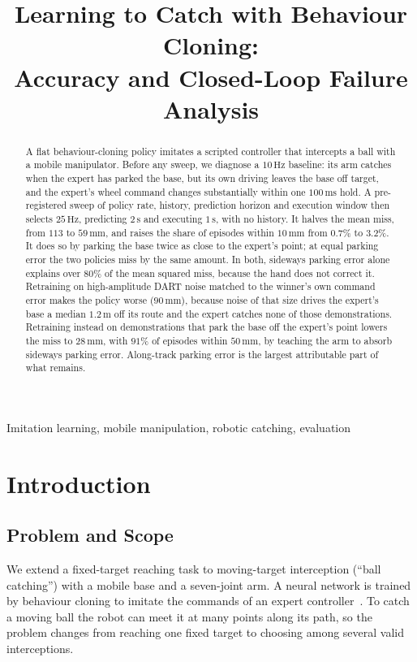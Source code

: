 \documentclass[conference]{IEEEtran}
\title{Learning to Catch with Behaviour Cloning:\\
Accuracy and Closed-Loop Failure Analysis}
\author{\IEEEauthorblockN{William Boyd, Nick Wright, Yiyan Wang}
\IEEEauthorblockA{University College London\\London, United Kingdom}}
\begin{document}
\maketitle

\begin{abstract}
A flat behaviour-cloning policy imitates a scripted controller that intercepts a ball with a mobile manipulator. Before any sweep, we diagnose a $10\,\mathrm{Hz}$ baseline: its arm catches when the expert has parked the base, but its own driving leaves the base off target, and the expert's wheel command changes substantially within one $100\,\mathrm{ms}$ hold. A pre-registered sweep of policy rate, history, prediction horizon and execution window then selects $25\,\mathrm{Hz}$, predicting $2\,\mathrm{s}$ and executing $1\,\mathrm{s}$, with no history. It halves the mean miss, from $113$ to $59\,\mathrm{mm}$, and raises the share of episodes within $10\,\mathrm{mm}$ from $0.7\%$ to $3.2\%$. It does so by parking the base twice as close to the expert's point; at equal parking error the two policies miss by the same amount. In both, sideways parking error alone explains over $80\%$ of the mean squared miss, because the hand does not correct it. Retraining on high-amplitude DART noise matched to the winner's own command error makes the policy worse ($90\,\mathrm{mm}$), because noise of that size drives the expert's base a median $1.2\,\mathrm{m}$ off its route and the expert catches none of those demonstrations. Retraining instead on demonstrations that park the base off the expert's point lowers the miss to $28\,\mathrm{mm}$, with $91\%$ of episodes within $50\,\mathrm{mm}$, by teaching the arm to absorb sideways parking error. Along-track parking error is the largest attributable part of what remains.
\end{abstract}

\begin{IEEEkeywords}
Imitation learning, mobile manipulation, robotic catching, evaluation
\end{IEEEkeywords}

\section{Introduction}
\subsection{Problem and Scope}
We extend a fixed-target reaching task to moving-target interception (``ball catching'') with a mobile base and a seven-joint arm. A neural network is trained by behaviour cloning to imitate the commands of an expert controller~\cite{pomerleau1991}. To catch a moving ball the robot can meet it at many points along its path, so the problem changes from reaching one fixed target to choosing among several valid interceptions.
\end{document}
